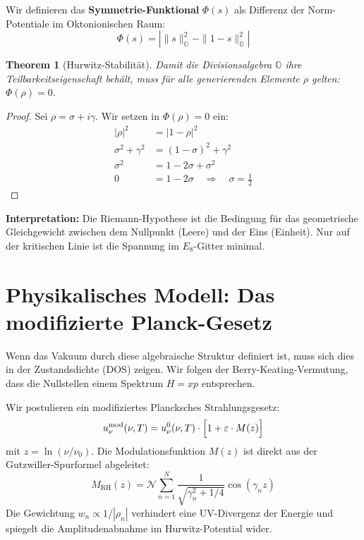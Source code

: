 \documentclass[11pt, a4paper]{article}
\newtheorem{theorem}{Theorem}
\begin{document}
	Wir definieren das \textbf{Symmetrie-Funktional} $\Phi(s)$ als Differenz der Norm-Potentiale im Oktonionischen Raum:
	\begin{equation}
		\Phi(s) = \left| \|s\|_{\mathbb{O}}^2 - \|1-s\|_{\mathbb{O}}^2 \right|
	\end{equation}
	
	\begin{theorem}[Hurwitz-Stabilität]
		Damit die Divisionsalgebra $\mathbb{O}$ ihre Teilbarkeitseigenschaft behält, muss für alle generierenden Elemente $\rho$ gelten: $\Phi(\rho) = 0$.
	\end{theorem}
	
	\begin{proof}
		Sei $\rho = \sigma + i\gamma$. Wir setzen in $\Phi(\rho) = 0$ ein:
		\begin{align}
			|\rho|^2 &= |1-\rho|^2 \\
			\sigma^2 + \gamma^2 &= (1-\sigma)^2 + \gamma^2 \\
			\sigma^2 &= 1 - 2\sigma + \sigma^2 \\
			0 &= 1 - 2\sigma \quad \Rightarrow \quad \sigma = \frac{1}{2}
		\end{align}
	\end{proof}
	\noindent
	\textbf{Interpretation:} Die Riemann-Hypothese ist die Bedingung für das geometrische Gleichgewicht zwischen dem Nullpunkt (Leere) und der Eins (Einheit). Nur auf der kritischen Linie ist die \glqq Spannung\grqq{} im $E_8$-Gitter minimal.
	
	\section{Physikalisches Modell: Das modifizierte Planck-Gesetz}
	
	Wenn das Vakuum durch diese algebraische Struktur definiert ist, muss sich dies in der Zustandsdichte (DOS) zeigen. Wir folgen der Berry-Keating-Vermutung, dass die Nullstellen einem Spektrum $H=xp$ entsprechen.
	
	Wir postulieren ein modifiziertes Plancksches Strahlungsgesetz:
	\begin{equation}
		u_\nu^{\text{mod}}(\nu,T) = u_\nu^{0}(\nu,T) \cdot \Bigl[ 1 + \varepsilon \cdot M(z) \Bigr]
	\end{equation}
	mit $z = \ln(\nu/\nu_0)$. Die Modulationsfunktion $M(z)$ ist direkt aus der Gutzwiller-Spurformel abgeleitet:
	\begin{equation}
		M_{\text{RH}}(z) = \mathcal{N} \sum_{n=1}^{N} \frac{1}{\sqrt{\gamma_n^2 + 1/4}} \cos(\gamma_n z)
	\end{equation}
	Die Gewichtung $w_n \propto 1/|\rho_n|$ verhindert eine UV-Divergenz der Energie und spiegelt die Amplitudenabnahme im Hurwitz-Potential wider.
	
\end{document}
